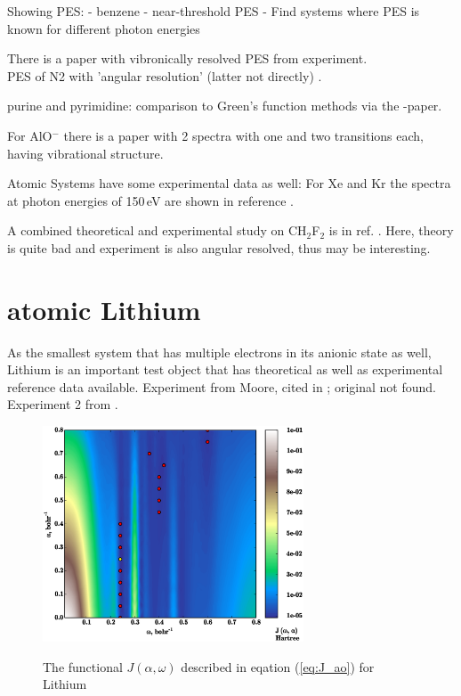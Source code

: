 Showing PES:
 - benzene
 - near-threshold PES
 - Find systems where PES is known for different photon energies

There is a paper\cite{vibPES} with vibronically resolved PES from experiment.\\
PES of N2 with 'angular resolution' (latter not directly) \cite{PESN2}.

purine and pyrimidine: comparison to Green's function methods via the \cite{PottsHolland}-paper.

For AlO$^-$ there is a paper with 2 spectra with one and two transitions each, having vibrational
structure\cite{AlO}.

Atomic Systems have some experimental data as well: For Xe and Kr the spectra at photon energies of 150$\,$eV are shown in reference \cite{KrXe}.

A combined theoretical and experimental study on CH$_2$F$_2$ is in ref. \cite{ch2f2}. Here, theory is quite bad and experiment is also angular resolved, thus may be interesting.

\section{atomic Lithium}
As the smallest system that has multiple electrons in its anionic state as well, Lithium is an important
test object that has theoretical as well as experimental reference data available\cite{Li-R,Li-R1, LiNaRef1}.
Experiment from Moore, cited in \cite{LiNaRef1}; original not found.
Experiment 2 from \cite{LiSonntag}.

\begin{figure}
\includegraphics[width=0.69\textwidth]{Figures/Lithium/Lithium_J0_2D_terrain_path_spline_cut}
\label{fig:Lith-otrsh}
\caption{The functional $J(\alpha,\omega)$ described in eqation (\ref{eq:J_ao}) for Lithium}
\end{figure}

